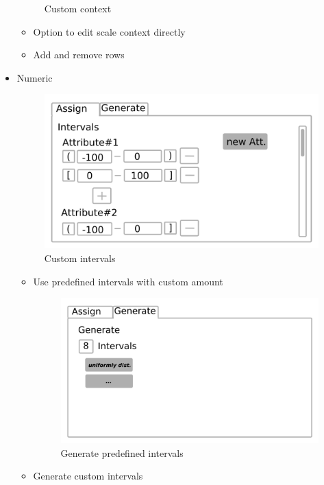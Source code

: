 \documentclass[]{report}
\begin{document}
\begin{itemize}
\begin{figure}[H]
			\caption{Custom context}
			\label{fig:o2}
		\end{figure}
		\begin{itemize}
			\item Option to edit scale context directly
			\item Add and remove rows
		\end{itemize}
	\item Numeric
		\begin{figure}[H]
			\includegraphics[width=\linewidth]{mock_up/num.png}
			\caption{Custom intervals}
			\label{fig:n1}
		\end{figure}
	    \begin{itemize}
	    	\item Use predefined intervals with custom amount
	    	\begin{figure}[H]
	    		\includegraphics[width=\linewidth]{mock_up/num_gen.png}
	    		\caption{Generate predefined intervals}
	    		\label{fig:n1}
	    	\end{figure}
	    	\item Generate custom intervals
	    \end{itemize}
\end{itemize}
\end{document}
